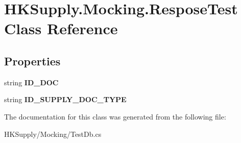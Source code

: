\hypertarget{class_h_k_supply_1_1_mocking_1_1_respose_test}{}\section{H\+K\+Supply.\+Mocking.\+Respose\+Test Class Reference}
\label{class_h_k_supply_1_1_mocking_1_1_respose_test}
\subsection*{Properties}
\begin{DoxyCompactItemize}
\item 
\mbox{\label{class_h_k_supply_1_1_mocking_1_1_respose_test_a62901a07ef47944a0c174e5775a210e3}} 
string {\bfseries I\+D\+\_\+\+D\+OC}
\item 
\mbox{\label{class_h_k_supply_1_1_mocking_1_1_respose_test_a6303843d0b14a2706aed3af0c1530418}} 
string {\bfseries I\+D\+\_\+\+S\+U\+P\+P\+L\+Y\+\_\+\+D\+O\+C\+\_\+\+T\+Y\+PE}
\end{DoxyCompactItemize}


The documentation for this class was generated from the following file\+:\begin{DoxyCompactItemize}
\item 
H\+K\+Supply/\+Mocking/Test\+Db.\+cs\end{DoxyCompactItemize}

